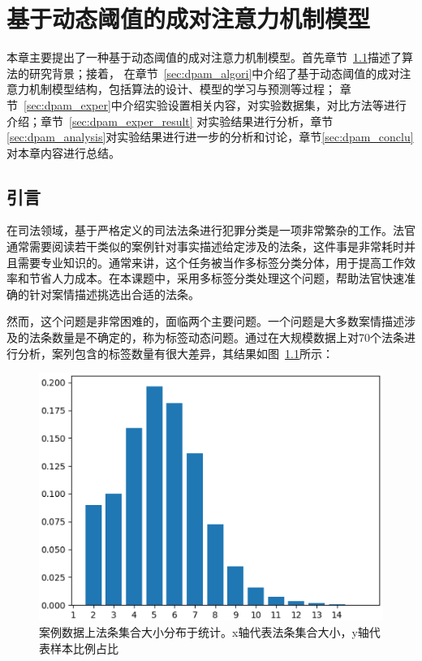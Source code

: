 
\chapter{基于动态阈值的成对注意力机制模型}
\label{chapter:3}
本章主要提出了一种基于动态阈值的成对注意力机制模型。首先章节~\ref{sec:dpam_intro}描述了算法的研究背景；接着，
在章节~\ref{sec:dpam_algori}中介绍了基于动态阈值的成对注意力机制模型结构，包括算法的设计、模型的学习与预测等过程；
章节~\ref{sec:dpam_exper}中介绍实验设置相关内容，对实验数据集，对比方法等进行介绍；章节~\ref{sec:dpam_exper_result}
对实验结果进行分析，章节\ref{sec:dpam_analysis}对实验结果进行进一步的分析和讨论，章节\ref{sec:dpam_conclu}对本章内容进行总结。

\section{引言}
\label{sec:dpam_intro}

在司法领域，基于严格定义的司法法条进行犯罪分类是一项非常繁杂的工作。法官通常需要阅读若干类似的案例针对事实描述给定涉及的法条，这件事是非常耗时并且需要专业知识的。通常来讲，这个任务被当作多标签分类分体，用于提高工作效率和节省人力成本。在本课题中，采用多标签分类处理这个问题，帮助法官快速准确的针对案情描述挑选出合适的法条。

然而，这个问题是非常困难的，面临两个主要问题。一个问题是大多数案情描述涉及的法条数量是不确定的，称为标签动态问题。通过在大规模数据上对70个法条进行分析，案列包含的标签数量有很大差异，其结果如图~\ref{fig:dis1}所示：
\begin{figure}[htbp]
\centering
\includegraphics[scale=0.5,viewport=0 0 450 350,clip=true]{./sources/1.eps}
\caption{\label{fig:dis1}案例数据上法条集合大小分布于统计。x轴代表法条集合大小，y轴代表样本比例占比}
\end{figure}

